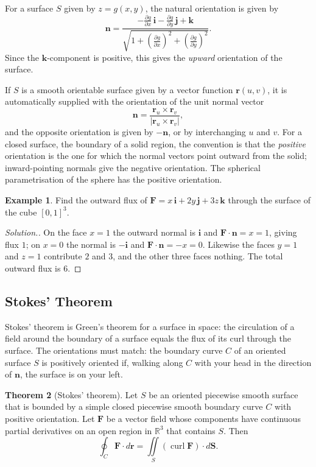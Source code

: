 \documentclass[11pt,a4paper]{article}
\DeclareMathOperator{\curl}{curl}
\theoremstyle{definition}
\newtheorem{thm}{Theorem}[subsection]
\newtheorem{exa}[thm]{Example}
\newenvironment{solution}
  {\renewcommand{\qedsymbol}{}\begin{proof}[\textit{Solution}.]}
  {\end{proof}}
\begin{document}
For a surface $S$ given by $z = g(x,y)$, the natural orientation is given by
\[\mathbf n = \frac{-\frac{\partial g}{\partial x} \,\mathbf i - \frac{\partial
g}{\partial y}\,\mathbf j + \mathbf k}{\sqrt{1 + \left(\frac{\partial g}{\partial
x}\right)^2 + \left(\frac{\partial g}{\partial y}\right)^2}} .\]
Since the $\mathbf k$-component is positive, this gives the \emph{upward}
orientation of the surface.

If $S$ is a smooth orientable surface given by a vector function
$\mathbf r(u,v)$, it is automatically supplied with the orientation of the unit
normal vector
\[\mathbf n=\frac{\mathbf r_u \times \mathbf r_v}{|\mathbf r_u \times \mathbf
r_v|} ,\]
and the opposite orientation is given by $-\mathbf n$, or by interchanging $u$
and $v$. For a closed surface, the boundary of a solid region, the convention is
that the \emph{positive} orientation is the one for which the normal vectors
point outward from the solid; inward-pointing normals give the negative
orientation. The spherical parametrisation of the sphere has the positive
orientation.

\begin{exa}
\label{ex:fluxcube}
Find the outward flux of $\mathbf F = x\,\mathbf i + 2y\,\mathbf j + 3z\,\mathbf
k$ through the surface of the cube $[0,1]^3$.
\end{exa}

\begin{solution}
On the face $x = 1$ the outward normal is $\mathbf i$ and $\mathbf F\cdot\mathbf
n = x = 1$, giving flux $1$; on $x = 0$ the normal is $-\mathbf i$ and
$\mathbf F\cdot\mathbf n = -x = 0$. Likewise the faces $y = 1$ and $z = 1$
contribute $2$ and $3$, and the other three faces nothing. The total outward flux
is $6$.
\end{solution}

{\color[wave]{485}\subsection{Stokes' Theorem}}

Stokes' theorem is Green's theorem for a surface in space: the circulation of a
field around the boundary of a surface equals the flux of its curl through the
surface. The orientations must match: the boundary curve $C$ of an oriented
surface $S$ is positively oriented if, walking along $C$ with your head in the
direction of $\mathbf n$, the surface is on your left.

\begin{thm}[Stokes' theorem]
\label{thm:stokes}
Let $S$ be an oriented piecewise smooth surface that is bounded by a simple
closed piecewise smooth boundary curve $C$ with positive orientation. Let
$\mathbf F$ be a vector field whose components have continuous partial
derivatives on an open region in $\mathbb{R}^3$ that contains $S$. Then
\[\oint_C \mathbf F\cdot d\mathbf r = \iint\limits_S(\curl \mathbf F)\cdot
d\mathbf S .\]
\end{thm}
\end{document}
